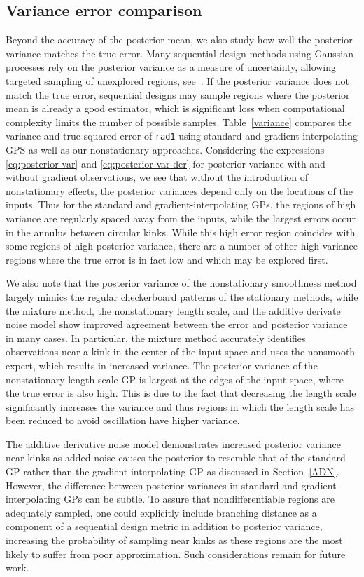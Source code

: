 \documentclass{article}
\numberwithin{equation}{section}
\begin{document}
\subsection{Variance error comparison}
Beyond the accuracy of the posterior mean, we also study how well the posterior variance matches the true error. Many sequential design methods using Gaussian processes rely on the posterior variance as a measure of uncertainty, allowing targeted sampling of unexplored regions, see~\cite{jones1998efficient, ranjan2008sequential}. If the posterior variance does not match the true error, sequential designs may sample regions where the posterior mean is already a good estimator, which is significant loss when computational complexity limits the number of possible samples. Table~\ref{variance} compares the variance and true squared error of \texttt{rad1} using standard and gradient-interpolating GPS as well as our nonstationary approaches. Considering the expressions \eqref{eq:posterior-var} and \eqref{eq:posterior-var-der} for posterior variance with and without gradient observations, we see that without the introduction of nonstationary effects, the posterior variances depend only on the locations of the inputs. Thus for the standard and gradient-interpolating GPs, the regions of high variance are regularly spaced away from the inputs, while the largest errors occur in the annulus between circular kinks. While this high error region coincides with some regions of high posterior variance, there are a number of other high variance regions where the true error is in fact low and which may be explored first.

We also note that the posterior variance of the nonstationary smoothness method largely mimics the regular checkerboard patterns of the stationary methods, while the mixture method, the nonstationary length scale, and the additive derivate noise model show improved agreement between the error and posterior variance in many cases. In particular, the mixture method accurately identifies observations near a kink in the center of the input space and uses the nonsmooth expert, which results in increased variance. The posterior variance of the nonstationary length scale GP is largest at the edges of the input space, where the true error is also high. This is due to the fact that decreasing the length scale significantly increases the variance and thus regions in which the length scale has been reduced to avoid oscillation have higher variance.

The additive derivative noise model demonstrates increased posterior variance near kinks as added noise causes the posterior to resemble that of the standard GP rather than the gradient-interpolating GP as discussed in Section~\ref{ADN}. However, the difference between posterior variances in standard and gradient-interpolating GPs can be subtle. To assure that nondifferentiable regions are adequately sampled, one could explicitly include branching distance as a component of a sequential design metric in addition to posterior variance, increasing the probability of sampling near kinks as these regions are the most likely to suffer from poor approximation. Such considerations remain for future work.
\end{document}
